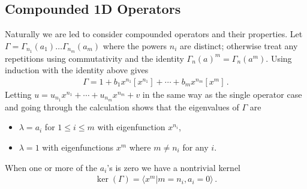 \subsection{Compounded 1D Operators}

Naturally we are led to consider compounded operators and their properties. Let $\Gamma = \Gamma_{n_1}(a_1)\ldots\Gamma_{n_m}(a_m)$ where the powers $n_i$ are distinct; otherwise treat any repetitions using commutativity and the identity $\Gamma_n(a)^m = \Gamma_n(a^m)$. Using induction with the identity above gives
\begin{align}
	\Gamma = 1 + b_1x^{n_1}[x^{n_1}]+\cdots + b_mx^{n_m}[x^m]\,.
\end{align}
Letting $u = u_{n_1}x^{n_1}+\cdots+ u_{n_m}x^{n_m} + v$ in the same way as the single operator case and going through the calculation shows that the eigenvalues of $\Gamma$ are
\begin{itemize}
\item $\lambda = a_i$ for $1\leq i \leq m$ with eigenfunction $x^{n_i}$,
\item $\lambda = 1$ with eigenfunctions $x^m$ where $m \neq n_i$ for any $i$.
\end{itemize}

When one or more of the $a_i$'s is zero we have a nontrivial kernel
\begin{align}
	\ker(\Gamma) = \langle x^m | m = n_i, a_i = 0\rangle\,.
\end{align}

